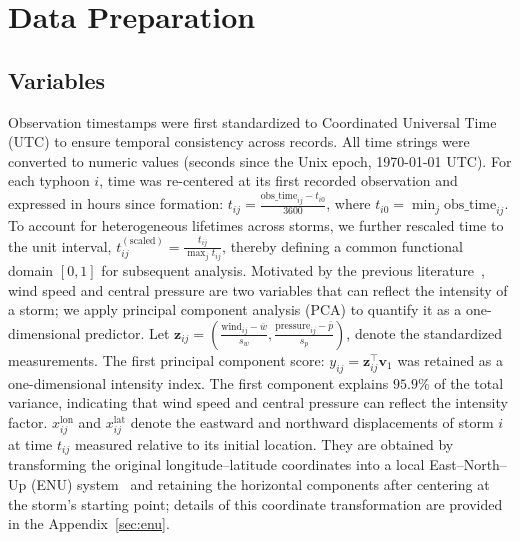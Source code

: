 \documentclass{article}
\begin{document}
\section{Data Preparation}
\label{sec:datapreparation}
\subsection{Variables}
Observation timestamps were first standardized to Coordinated Universal Time (UTC) to ensure temporal consistency across records. All time strings were converted to numeric values (seconds since the Unix epoch, 1970-01-01 UTC). For each typhoon $i$, time was re-centered at its first recorded observation and expressed in hours since formation: $t_{ij} = \frac{\mathrm{obs\_time}_{ij} - t_{i0}}{3600}$, where $t_{i0} = \min_j \mathrm{obs\_time}_{ij}$. To account for heterogeneous lifetimes across storms, we further rescaled time to the unit interval, $t_{ij}^{(\mathrm{scaled})}= \frac{t_{ij}}{\max_j t_{ij}}$, thereby defining a common functional domain $[0,1]$ for subsequent analysis. Motivated by the previous literature~\cite{ChavasKnaff2024Model, Agbley2009PCA}, wind speed and central pressure are two variables that can reflect the intensity of a storm; we apply principal component analysis (PCA) to quantify it as a one-dimensional predictor. Let $\mathbf{z}_{ij}=\left(\frac{\mathrm{wind}_{ij} - \bar{w}}{s_w}, \frac{\mathrm{pressure}_{ij} - \bar{p}}{s_p}\right)$, denote the standardized measurements. The first principal component score:  $y_{ij}= \mathbf{z}_{ij}^{\top}\mathbf{v}_1$ was retained as a one-dimensional intensity index. The first component explains $95.9\%$ of the total variance, indicating that wind speed and central pressure can reflect the intensity factor. $x^{\mathrm{lon}}_{ij}$ and $x^{\mathrm{lat}}_{ij}$ denote the eastward and northward displacements of storm $i$ at time $t_{ij}$ measured relative to its initial location. They are obtained by transforming the original longitude--latitude coordinates into a local East--North--Up (ENU) system~\cite{esa_navipedia_enu} and retaining the horizontal components after centering at the storm's starting point; details of this coordinate transformation are provided in the Appendix~\ref{sec:enu}.
\end{document}

